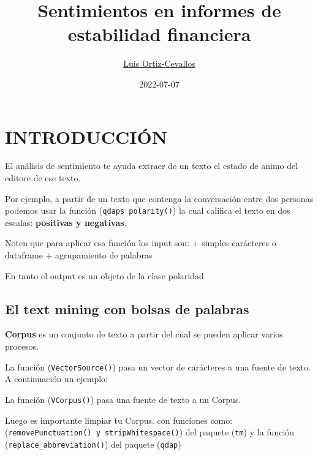 \documentclass[
]{article}
\title{Sentimientos en informes de estabilidad financiera}
\author{\href{https://ortiz-cevallos.github.io/MYSELF/}{Luis Ortiz-Cevallos}}
\date{2022-07-07}
\begin{document}
\maketitle

{
\setcounter{tocdepth}{2}
\tableofcontents
}
\hypertarget{introducciuxf3n}{%
\section{INTRODUCCIÓN}\label{introducciuxf3n}}

El análisis de sentimiento te ayuda extraer de un texto el estado de animo del editore de ese texto.

Por ejemplo, a partir de un texto que contenga la conversación entre dos personas podemos usar la función (\texttt{qdap\textquotesingle{}s\ polarity()}) la cual califica el texto en dos escalas: \textbf{positivas y negativas}.

Noten que para aplicar esa función los input son:
+ simples carácteres o dataframe
+ agrupamiento de palabras

En tanto el output es un objeto de la clase polaridad

\hypertarget{el-text-mining-con-bolsas-de-palabras}{%
\subsection{El text mining con bolsas de palabras}\label{el-text-mining-con-bolsas-de-palabras}}

\textbf{Corpus} es un conjunto de texto a partir del cual se pueden aplicar varios procesos.

La función (\texttt{VectorSource()}) pasa un vector de carácteres a una fuente de texto. A continuación un ejemplo:

La función (\texttt{VCorpus()}) pasa una fuente de texto a un Corpus.

Luego es importante limpiar tu Corpus. con funciones como: (\texttt{removePunctuation()\ y\ stripWhitespace()}) del paquete (\texttt{tm}) y la función
(\texttt{replace\_abbreviation()}) del paquete (\texttt{qdap})
\end{document}
